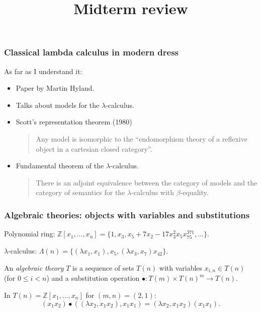 \documentclass[aspectratio=169]{fancyslides} %
\title{Midterm review}
\begin{document}
  \maketitle

  \begin{frame}
    \frametitle{Classical lambda calculus in modern dress}

    As far as I understand it:
    \begin{itemize}
      \item Paper by Martin Hyland.
      \item Talks about models for the $ \lambda $-calculus.
      \item Scott's representation theorem (1980)
        \begin{quote}
          Any model is isomorphic to the ``endomorphism theory of a reflexive object in a cartesian closed category''.
        \end{quote}
      \item Fundamental theorem of the $ \lambda $-calculus.
        \begin{quote}
          There is an adjoint equivalence between the category of models and the category of semantics for the $ \lambda $-calculus with $ \beta $-equality.
        \end{quote}
    \end{itemize}
  \end{frame}

  \begin{frame}
    \frametitle{Algebraic theories: objects with variables and substitutions}

    \begin{example}
      Polynomial ring: $ \mathbb Z[x_1, ..., x_n] = \{ 1, x_3, x_5 + 7 x_2 - 17 x_3^2 x_5 x_{75}^{371}, \dots \} $.
    \end{example}

    \pause

    \begin{example}
      $ \lambda $-calculus: $ \Lambda(n) = \{ (\lambda x_1, x_1), x_5, (\lambda x_3, x_7) x_{42} \} $.
    \end{example}

    \pause

    \begin{definition}
      An \textit{algebraic theory} $ T $ is a sequence of sets $ T(n) $ with variables $ x_{i, n} \in T(n) $ (for $ 0 \leq i < n $) and a substitution operation $ \bullet : T(m) \times T(n)^m \to T(n) $.
    \end{definition}

    \pause

    \begin{example}
      In $ T(n) = \mathbb Z[x_1, \dots, x_n] $ for $ (m, n) = (2, 1) $:
      \[ (x_1 x_2) \bullet ((\lambda x_2, x_1 x_2), x_1 x_1) = (\lambda x_2, x_1 x_2) (x_1 x_1). \]
    \end{example}
  \end{frame}
\end{document}
